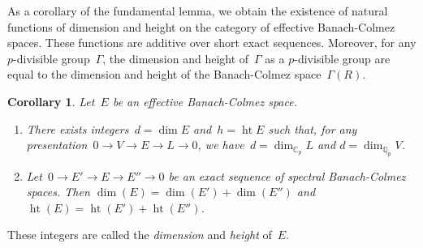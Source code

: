 \documentclass{article}
\newtheorem{cor}[thm]{Corollary}
\theoremstyle{definition}
\DeclareMathOperator\haut{ht}
\def\Qp{{ℚ_p}}
\def\Cp{{ℂ_p}}
\begin{document}
As a corollary of the fundamental lemma, we obtain the existence of
natural functions of dimension and height on the category of effective
Banach-Colmez spaces. These functions are additive over short exact
sequences. Moreover, for any $p$-divisible group~$Γ$, the dimension and
height of~$Γ$ as a $p$-divisible group are equal to the dimension and
height of the Banach-Colmez space~$Γ(R)$.

\begin{cor}
Let~$E$ be an effective Banach-Colmez space.
\begin{enumerate}
\item There exists integers~$d = \dim E$ and~$h = \haut E$ such that, for
any presentation~$0 → V → E → L → 0$,
we have~$d = \dim_{\Cp} L$ and $d = \dim_{\Qp} V$.
\item Let~$0 → E' → E → E'' → 0$ be an exact sequence of spectral
Banach-Colmez spaces. Then $\dim(E) = \dim(E') + \dim(E'')$ and $\haut(E)
= \haut(E') + \haut(E'')$.
\end{enumerate}
\end{cor}

These integers are called the \emph{dimension} and \emph{height} of~$E$.
\end{document}
